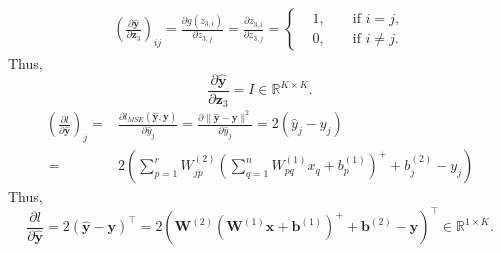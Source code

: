 \documentclass[10pt,a4paper]{article}
\theoremstyle{dotlessP}
\def\RR{\mathbb{R}}
\newcommand{\dldy}{\frac{\partial l}{\partial \bm{\hat{y}}}}
\newcommand{\dydz}{\frac{\partial \bm{\hat{y}}}{\partial \bm z_3}}
\newcommand{\yh}{\bm{\hat{y}}}
\begin{document}
\begin{enumerate}[(a)]
\begin{equation}
\begin{aligned}
\left(\dydz\right)_{ij}= \frac{\partial g( z_{3,i} ) }{\partial  z_{3,j}} = \frac{\partial  z_{3,i}  }{\partial z_{3,j}}
=\left\lbrace 
\begin{aligned}
&1, & &\text{ if } i=j,\\
& 0, &  &\text{ if } i\neq j.
\end{aligned}
\right. 
\end{aligned}
\end{equation}
Thus,
\begin{equation}
\dydz = I \in \RR^{K\times K}.
\end{equation}
\begin{equation}
\begin{aligned}
\left(\dldy\right)_j = &\frac{\partial l_{MSE}(\yh,\bm y)}{\partial \hat{y}_j}= \frac{\partial \|\yh-\bm y\|^2}{\partial \hat{y}_j} = 2(\hat{y}_j - y_j)\\\
=& 2\left(\sum_{p=1}^{r}W^{(2)}_{jp} \left( \sum_{q=1}^nW^{(1)}_{pq}x_q+b^{(1)}_p\right)^++b^{(2)}_j- y_j\right) 
\end{aligned}
\end{equation}
Thus, 
\begin{equation}
\dldy = 2(\yh -\bm y)^\top =2 \left(\bm W^{(2)}\left(\bm W^{(1)} \bm x+\bm b^{(1)}\right)^+ + \bm b^{(2)}-\bm y\right)^\top\in \RR^{1\times K}.
\end{equation}
\end{enumerate}
\end{document}
